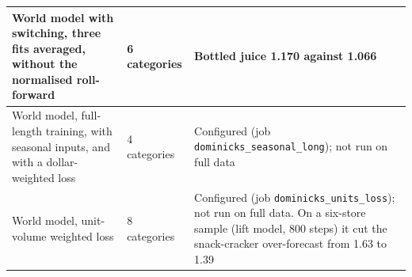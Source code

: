 \begin{table}[t]
\begin{tabular}{p{}p{}>{\raggedright\arraybackslash}p{}}
\midrule
World model with switching, three fits averaged, without the normalised roll-forward & 6 categories & Bottled juice 1.170 against 1.066 \\
\midrule
World model, full-length training, with seasonal inputs, and with a dollar-weighted loss & 4 categories & Configured (job \texttt{dominicks\_seasonal\_long}); not run on full data \\
World model, unit-volume weighted loss & 8 categories & Configured (job \texttt{dominicks\_units\_loss}); not run on full data. On a six-store sample (lift model, 800 steps) it cut the snack-cracker over-forecast from 1.63 to 1.39 \\
\bottomrule
\end{tabular}
\end{table}

